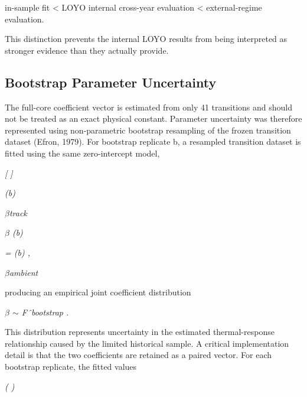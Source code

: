 in-sample fit < LOYO internal cross-year evaluation < external-regime evaluation.

This distinction prevents the internal LOYO results from being interpreted as stronger evidence than they actually provide.

\subsection{Bootstrap Parameter Uncertainty}
The full-core coefficient vector is estimated from only 41 transitions and should not be treated as an exact physical constant. Parameter uncertainty was therefore represented using non-parametric bootstrap resampling of the frozen transition dataset (Efron, 1979). For bootstrap replicate b, a resampled transition dataset is fitted using the same zero-intercept model,

\begin{center}\textit{[       ]}\end{center}

\begin{center}\textit{(b)}\end{center}

\begin{center}\textit{\ensuremath{\beta}track}\end{center}

\begin{center}\textit{\ensuremath{\beta}    (b)}\end{center}

\begin{center}\textit{= (b)         ,}\end{center}

\begin{center}\textit{\ensuremath{\beta}ambient}\end{center}

producing an empirical joint coefficient distribution

\begin{center}\textit{\ensuremath{\beta} \ensuremath{\sim} Fˆbootstrap .}\end{center}

This distribution represents uncertainty in the estimated thermal-response relationship caused by the limited historical sample. A critical implementation detail is that the two coefficients are retained as a paired vector. For each bootstrap replicate, the fitted values

\begin{center}\textit{(                       )}\end{center}

